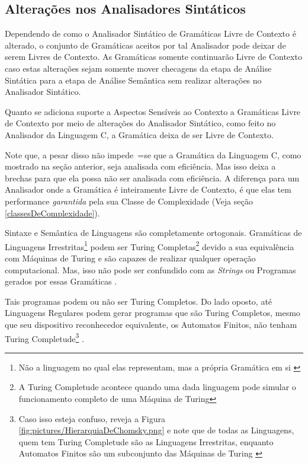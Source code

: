 {\subsection{Alterações nos Analisadores Sintáticos}

    Dependendo de como o Analisador Sintático de Gramáticas Livre de Contexto é alterado,
    o conjunto de Gramáticas aceitos por tal Analisador pode deixar de serem Livres de Contexto.
    As Gramáticas somente continuarão Livre de Contexto caso estas alterações sejam somente mover checagens da etapa de Análise Sintática para a etapa de Análise Semântica sem realizar alterações no Analisador Sintático.

    Quanto se adiciona suporte a Aspectos Sensíveis ao Contexto \cite{contextSensitiveParsing} a Gramáticas Livre de Contexto por meio de alterações do Analisador Sintático,
    como feito no Analisador da Linguagem C,
    a Gramática deixa de ser Livre de Contexto.

    Note que,
    a pesar disso não impede~=se que a Gramática da Linguagem C,
    como mostrado na seção anterior,
    seja analisada com eficiência.
    Mas isso deixa a brechas para que ela possa não ser analisada com eficiência.
    A diferença para um Analisador onde a Gramática é inteiramente Livre de Contexto,
    é que elas tem performance \textit{garantida} pela sua Classe de Complexidade (Veja seção \ref{classesDeComplexidade}).

    Sintaxe e
    Semântica de Linguagens são completamente ortogonais.
    Gramáticas de Linguagens Irrestritas\footnote{
    Não a linguagem no qual elas representam,
    mas a própria Gramática em si \cite{finiteAutomataTuringComplete}
    }
    podem ser Turing Completas\footnote{
    A Turing Completude acontece quando uma dada linguagem pode simular o funcionamento completo de uma Máquina de Turing
    }
    devido a sua equivalência com Máquinas de Turing e
    são capazes de realizar qualquer operação computacional.
    Mas,
    isso não pode ser confundido com as \textit{Strings} ou
    Programas gerados por essas Gramáticas \cite{areThereDomainSpecificLanguages}.

    Tais programas podem ou
    não ser Turing Completos.
    Do lado oposto,
    até Linguagens Regulares podem gerar programas que são Turing Completos,
    mesmo que seu dispositivo reconhecedor equivalente,
    os Automatos Finitos,
    não tenham Turing Completude\footnote{
    Caso isso esteja confuso,
    reveja a Figura \ref{fig:pictures/HierarquiaDeChomsky.png} e
    note que de todas as Linguagens,
    quem tem Turing Completude são as Linguagens Irrestritas,
    enquanto Automatos Finitos são um subconjunto das Máquinas de Turing \cite{finiteAutomataTuringComplete}
    }
    \cite{turingCompleteRegularLanguages,finiteAutomataTuringComplete}.

}
